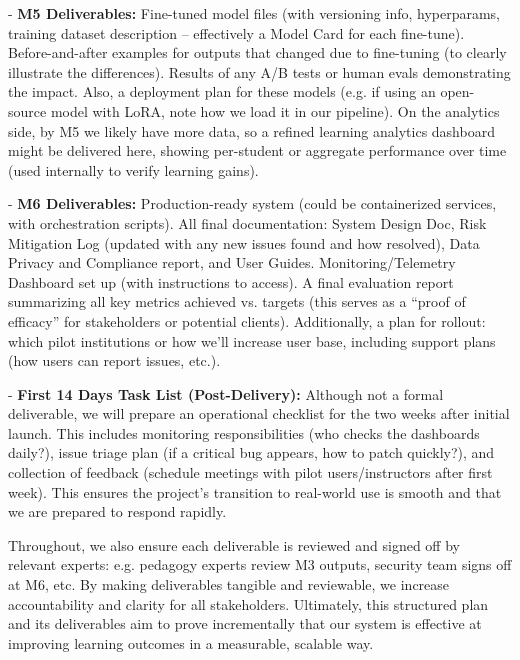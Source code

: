\documentclass[11pt]{article}
\begin{document}
- \textbf{M5 Deliverables:} Fine-tuned model files (with versioning info, hyperparams, training dataset description – effectively a Model Card for each fine-tune). Before-and-after examples for outputs that changed due to fine-tuning (to clearly illustrate the differences). Results of any A/B tests or human evals demonstrating the impact. Also, a deployment plan for these models (e.g. if using an open-source model with LoRA, note how we load it in our pipeline). On the analytics side, by M5 we likely have more data, so a refined learning analytics dashboard might be delivered here, showing per-student or aggregate performance over time (used internally to verify learning gains).

- \textbf{M6 Deliverables:} Production-ready system (could be containerized services, with orchestration scripts). All final documentation: System Design Doc, Risk Mitigation Log (updated with any new issues found and how resolved), Data Privacy and Compliance report, and User Guides. Monitoring/Telemetry Dashboard set up (with instructions to access). A final evaluation report summarizing all key metrics achieved vs. targets (this serves as a “proof of efficacy” for stakeholders or potential clients). Additionally, a plan for rollout: which pilot institutions or how we’ll increase user base, including support plans (how users can report issues, etc.).

- \textbf{First 14 Days Task List (Post-Delivery):} Although not a formal deliverable, we will prepare an operational checklist for the two weeks after initial launch. This includes monitoring responsibilities (who checks the dashboards daily?), issue triage plan (if a critical bug appears, how to patch quickly?), and collection of feedback (schedule meetings with pilot users/instructors after first week). This ensures the project’s transition to real-world use is smooth and that we are prepared to respond rapidly.

Throughout, we also ensure each deliverable is reviewed and signed off by relevant experts: e.g. pedagogy experts review M3 outputs, security team signs off at M6, etc. By making deliverables tangible and reviewable, we increase accountability and clarity for all stakeholders. Ultimately, this structured plan and its deliverables aim to prove incrementally that our system is effective at improving learning outcomes in a measurable, scalable way.
\end{document}
